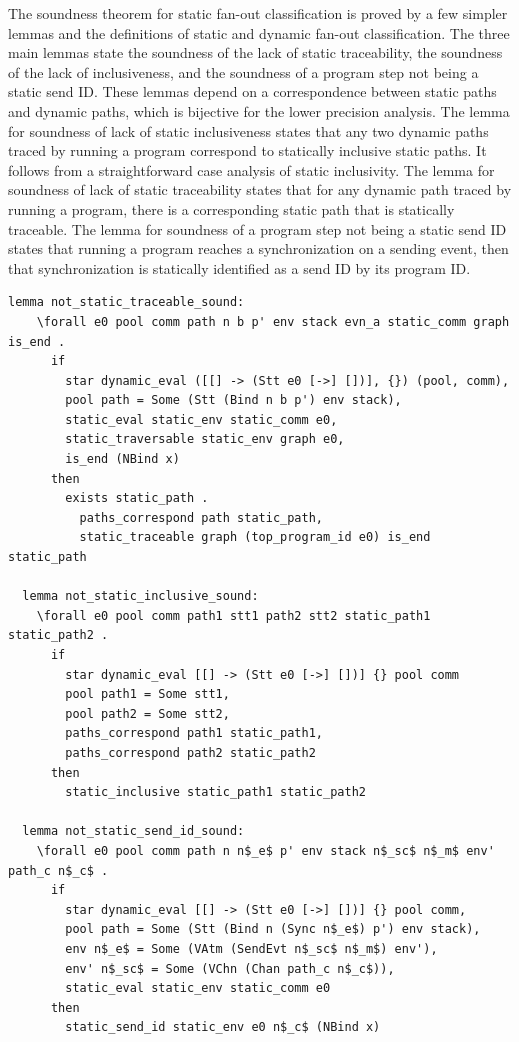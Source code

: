 \documentclass[10pt]{article}
\begin{document}
The soundness theorem for static fan-out classification is proved
by a few simpler lemmas and the
definitions of static and dynamic fan-out classification.  The three main lemmas state the
soundness of the lack of static traceability, the soundness of the lack of inclusiveness, and
the soundness of a program step not being a static send ID. These lemmas depend on a
correspondence between static paths and dynamic paths, which is bijective for the lower
precision analysis. The lemma for soundness of lack of static inclusiveness states that any two
dynamic paths traced by running a program correspond to statically inclusive static paths. It
follows from a straightforward case analysis of static inclusivity. The lemma for soundness of
lack of static traceability states that for any dynamic path traced by running a program, there
is a corresponding static path that is statically traceable. The lemma for soundness of a
program step not being a static send ID states that running a program reaches a
synchronization on a sending event, then that synchronization is statically identified as a
send ID by its program ID.

\begin{lstlisting}[language=logic, mathescape]
  lemma not_static_traceable_sound:
    \forall e0 pool comm path n b p' env stack evn_a static_comm graph is_end .
      if
        star dynamic_eval ([[] -> (Stt e0 [->] [])], {}) (pool, comm), 
        pool path = Some (Stt (Bind n b p') env stack),
        static_eval static_env static_comm e0,
        static_traversable static_env graph e0,
        is_end (NBind x)
      then
        exists static_path . 
          paths_correspond path static_path, 
          static_traceable graph (top_program_id e0) is_end static_path

  lemma not_static_inclusive_sound:
    \forall e0 pool comm path1 stt1 path2 stt2 static_path1 static_path2 . 
      if
        star dynamic_eval [[] -> (Stt e0 [->] [])] {} pool comm
        pool path1 = Some stt1, 
        pool path2 = Some stt2, 
        paths_correspond path1 static_path1, 
        paths_correspond path2 static_path2
      then
        static_inclusive static_path1 static_path2

  lemma not_static_send_id_sound:
    \forall e0 pool comm path n n$_e$ p' env stack n$_sc$ n$_m$ env' path_c n$_c$ .
      if
        star dynamic_eval [[] -> (Stt e0 [->] [])] {} pool comm, 
        pool path = Some (Stt (Bind n (Sync n$_e$) p') env stack), 
        env n$_e$ = Some (VAtm (SendEvt n$_sc$ n$_m$) env'), 
        env' n$_sc$ = Some (VChn (Chan path_c n$_c$)), 
        static_eval static_env static_comm e0
      then 
        static_send_id static_env e0 n$_c$ (NBind x)
\end{lstlisting}
\end{document}
